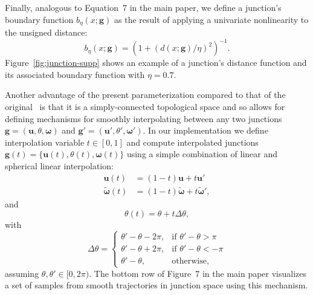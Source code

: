 \documentclass[main.tex]{subfiles}
\begin{document}
Finally, analogous to Equation~7 in the main paper, we define a junction's boundary function $b_\eta(x;\mathbf{g})$ as the result of applying a univariate nonlinearity to the unsigned distance:
\begin{equation}
    b_\eta(x;\mathbf{g})=\left(1 + (d(x;\mathbf{g})/\eta)^{2}\right)^{-1}.
\end{equation}
Figure~\ref{fig:junction-supp} shows an example of a junction's distance function and its associated boundary function with $\eta=0.7$.

Another advantage of the present parameterization compared to that of the original~\cite{verbin2021field} is that it is a simply-connected topological space and so allows for defining mechanisms for smoothly interpolating between any two junctions $\mathbf{g}=\left(\boldsymbol{u},\theta,\boldsymbol{\omega}\right)$ and $\mathbf{g}'=\left(\boldsymbol{u}',\theta',\boldsymbol{\omega}'\right)$. In our implementation we define interpolation variable  $t\in[0,1]$ and compute interpolated junctions $\mathbf{g}(t)=\{\boldsymbol{u}(t), \theta(t), \boldsymbol{\omega}(t)\}$ using
a simple combination of linear and spherical linear interpolation: 
\begin{align}
    \boldsymbol{u}(t) & = (1-t)\boldsymbol{u} + t\boldsymbol{u}' \\
    \tilde{\boldsymbol{\omega}}(t) & = (1-t)\tilde{\boldsymbol{\omega}} + t\tilde{\boldsymbol{\omega}}',
\end{align}
and
\begin{equation}
    \theta(t) = \theta + t\Delta\theta,
\end{equation}
with
\begin{equation*}
    \Delta\theta = 
    \begin{cases}
    \theta' - \theta - 2\pi, & \text{if } \theta' - \theta > \pi  \\
    \theta' - \theta + 2\pi, & \text{if } \theta' - \theta < -\pi \\
    \theta' - \theta, & \text{otherwise},
    \end{cases}
\end{equation*}
assuming $\theta,\theta'\in[0,2\pi)$. The bottom row of Figure~7 in the main paper visualizes a set of samples from smooth trajectories in junction space using this mechanism.
\end{document}
